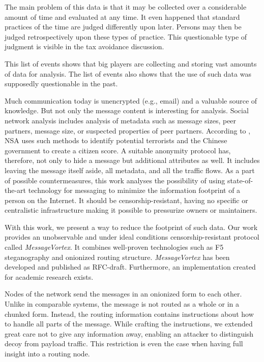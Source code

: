 \documentclass[acmsmall, screen, review]{acmart}
\begin{document}
The main problem of this data is that it may be collected over a considerable amount of time and evaluated at any time. It even happened that standard practices of the time are judged differently upon later. Persons may then be judged retrospectively upon these types of practice. This questionable type of judgment is visible in the tax avoidance discussion\cite{Amat1999}. 

This list of events shows that big players are collecting and storing vast amounts of data for analysis. The list of events also shows that the use of such data was supposedly questionable in the past. 

Much communication today is unencrypted (e.g., email) and a valuable source of knowledge. But not only the message content is interesting for analysis. Social network analysis includes analysis of metadata such as message sizes, peer partners, message size, or suspected properties of peer partners. According to \cite{Ackerman2013}, NSA uses such methods to identify potential terrorists and the Chinese government to create a citizen score. A suitable anonymity protocol has, therefore, not only to hide a message but additional attributes as well. It includes leaving the message itself aside, all metadata, and all the traffic flows. As a part of possible countermeasures, this work analyses the possibility of using state-of-the-art technology for messaging to minimize the information footprint of a person on the Internet. It should be censorship-resistant, having no specific or centralistic infrastructure making it possible to pressurize owners or maintainers. 

With this work, we present a way to reduce the footprint of such data. Our work provides an unobservable and under ideal conditions censorship-resistant protocol called \emph{MessageVortex}. It combines well-proven technologies such as F5 steganography and onionized routing structure. \emph{MessageVortex} has been developed and published as RFC-draft. Furthermore, an implementation created for academic research exists. 

Nodes of the network send the messages in an onionized form to each other. Unlike in comparable systems, the message is not routed as a whole or in a chunked form. Instead, the routing information contains instructions about how to handle all parts of the message. While crafting the instructions, we extended great care not to give any information away, enabling an attacker to distinguish decoy from payload traffic. This restriction is even the case when having full insight into a routing node.
\end{document}
